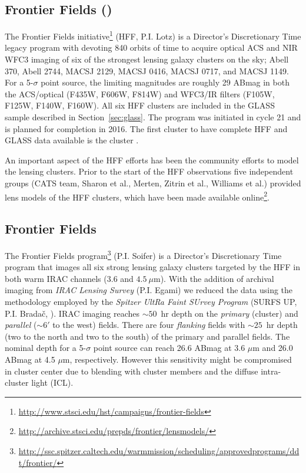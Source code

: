 \subsection{\hubble Frontier Fields (\hff)}
\label{sec:HFF}

The \hubble Frontier Fields initiative\footnote{\url{http://www.stsci.edu/hst/campaigns/frontier-fields}} (HFF,
P.I. Lotz) is a Director's Discretionary Time legacy program with \hst devoting 840 orbits of \hst
time to acquire optical ACS and NIR WFC3 imaging of six of the strongest lensing galaxy clusters on the sky;
Abell 370, Abell 2744, MACSJ 2129, MACSJ 0416, MACSJ 0717, and MACSJ 1149. For a 5-$\sigma$ point source, the
limiting magnitudes are roughly 29 ABmag in both the ACS/optical (F435W, F606W, F814W) and WFC3/IR filters
(F105W, F125W, F140W, F160W).  All six HFF clusters are included in the GLASS sample described in
Section~\ref{sec:glass}.  The program was initiated in \hst cycle 21 and is planned for completion in 2016.
The first cluster to have complete HFF and GLASS data available is the cluster \cler.

An important aspect of the HFF efforts has been the community efforts
to model the lensing clusters.  Prior to the start of the HFF
observations five independent groups (CATS team, Sharon et al.,
Merten, Zitrin et al., Williams et al.) provided
lens models of the HFF clusters, which have been made available
online\footnote{\url{http://archive.stsci.edu/prepds/frontier/lensmodels/}}.


\subsection{\spitzer Frontier Fields}
\label{sec:spitz}

The \spitzer Frontier Fields
program\footnote{\url{http://ssc.spitzer.caltech.edu/warmmission/scheduling/approvedprograms/ddt/frontier/}}
(P.I. Soifer) is a Director's Discretionary Time program that images all six strong lensing galaxy clusters
targeted by the HFF in both warm IRAC channels ($3.6$ and $4.5~\mu$m).  With the addition of archival imaging
from  \emph{IRAC Lensing Survey} (P.I. Egami) we reduced the data using the methodology employed by the
\emph{Spitzer UltRa Faint SUrvey Program} (SURFS UP, P.I. Brada\v{c}, \citealp{2014ApJ...785..108B}). IRAC
imaging reaches $\sim\!50$~hr depth on the \emph{primary} (\cler cluster) and \emph{parallel} ($\sim\!6'$ to the
west) fields.  There are four \emph{flanking} fields with $\sim\!25$~hr depth (two to the north and two to the
south) of the primary and parallel fields. The nominal depth for a 5-$\sigma$ point source can reach 26.6
ABmag at 3.6 $\mu$m and 26.0 ABmag at 4.5 $\mu$m, respectively. However this sensitivity might be compromised in
cluster center due to blending with cluster members and the diffuse intra-cluster light (ICL).


